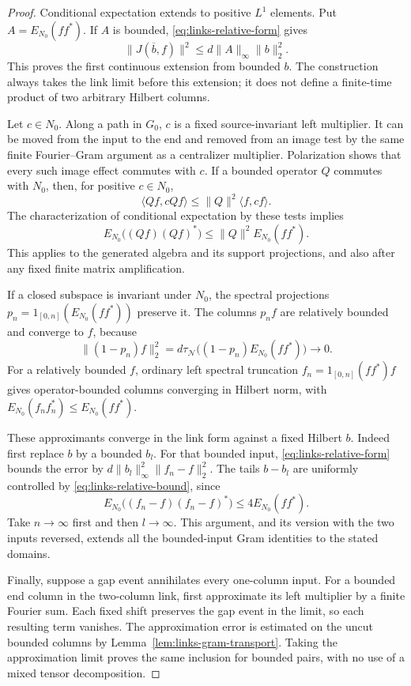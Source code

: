 \begin{proof}
Conditional expectation extends to positive \(L^1\) elements.
Put \(A=E_{N_0}(ff^*)\). If \(A\) is bounded,
\eqref{eq:links-relative-form} gives
\begin{equation}
 \|J(\overline b,f)\|^2
       \leq d\|A\|_\infty\|b\|_2^2.
 \label{eq:links-relative-bound}
\end{equation}
This proves the first continuous extension from bounded \(b\).
The construction always takes the link limit before this extension;
it does not define a finite-time product of two arbitrary Hilbert
columns.

Let \(c\in N_0\). Along a path in \(G_0\), \(c\) is a fixed
source-invariant left multiplier. It can be moved from the input
to the end and removed from an image test by the same finite
Fourier--Gram argument as a centralizer multiplier. Polarization
shows that every such image effect commutes with \(c\). If a
bounded operator \(Q\) commutes with \(N_0\), then, for positive
\(c\in N_0\),
\[
 \langle Qf,cQf\rangle
   \leq\|Q\|^2\langle f,cf\rangle.
\]
The characterization of conditional expectation by these tests
implies
\[
 E_{N_0}\bigl((Qf)(Qf)^*\bigr)
        \leq\|Q\|^2E_{N_0}(ff^*).
\]
This applies to the generated algebra and its support projections,
and also after any fixed finite matrix amplification.

If a closed subspace is invariant under \(N_0\), the spectral
projections \(p_n=1_{[0,n]}(E_{N_0}(ff^*))\) preserve it. The
columns \(p_nf\) are relatively bounded and converge to \(f\),
because
\[
 \|(1-p_n)f\|_2^2
  =d\tau_{\mathcal N}
        \bigl((1-p_n)E_{N_0}(ff^*)\bigr)\longrightarrow0.
\]
For a relatively bounded \(f\), ordinary left spectral truncation
\(f_n=1_{[0,n]}(ff^*)f\) gives operator-bounded columns converging
in Hilbert norm, with
\(E_{N_0}(f_nf_n^*)\leq E_{N_0}(ff^*)\).

These approximants converge in the link form against a fixed
Hilbert \(b\). Indeed first replace \(b\) by a bounded \(b_l\).
For that bounded input, \eqref{eq:links-relative-form} bounds the
error by \(d\|b_l\|_\infty^2\|f_n-f\|_2^2\).
The tails \(b-b_l\) are uniformly controlled by
\eqref{eq:links-relative-bound}, since
\[
 E_{N_0}\bigl((f_n-f)(f_n-f)^*\bigr)
       \leq 4E_{N_0}(ff^*).
\]
Take \(n\to\infty\) first and then \(l\to\infty\).
This argument, and its version with the two inputs reversed,
extends all the bounded-input Gram identities to the stated
domains.

Finally, suppose a gap event annihilates every one-column input.
For a bounded end column in the two-column link, first approximate
its left multiplier by a finite Fourier sum. Each fixed shift
preserves the gap event in the limit, so each resulting term
vanishes. The approximation error is estimated on the uncut
bounded columns by Lemma~\ref{lem:links-gram-transport}. Taking
the approximation limit proves the same inclusion for bounded
pairs, with no use of a mixed tensor decomposition.
\end{proof}

